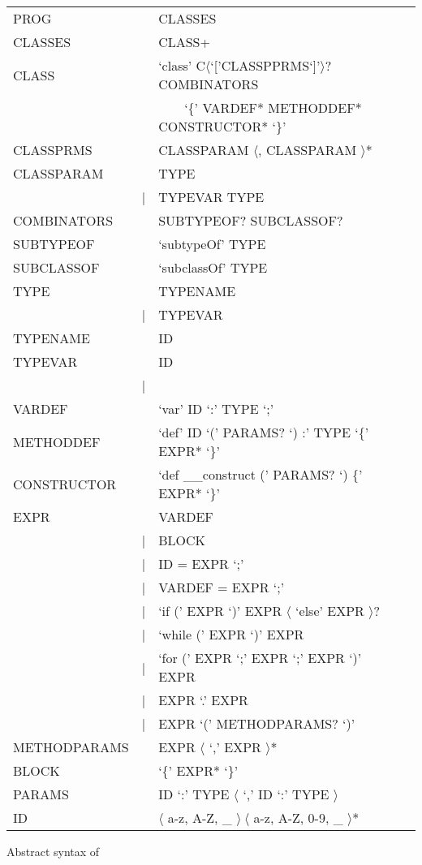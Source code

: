 \begin{listing}
	\begin{tabular}[H]{lrll}
		PROG & \lra & CLASSES \\
		CLASSES & \lra & CLASS+ \\
		CLASS & \lra & `class' C$\langle$`['CLASSPPRMS`]'$\rangle$? COMBINATORS \\
		& & ~~~~`\{' VARDEF* METHODDEF* CONSTRUCTOR* `\}' \\
		CLASSPRMS & \lra & CLASSPARAM $\langle$, CLASSPARAM $\rangle$* \\
		CLASSPARAM & \lra & TYPE \\
		 & | & TYPEVAR \match TYPE \\
		COMBINATORS & \lra & SUBTYPEOF? SUBCLASSOF? \\
		SUBTYPEOF & \lra & `subtypeOf' TYPE \\
		SUBCLASSOF & \lra & `subclassOf' TYPE \\
		TYPE & \lra & TYPENAME \\
		& | & TYPEVAR \\
		TYPENAME & \lra & ID \\
		TYPEVAR & \lra & ID \\
		& | & \mytype \\
		VARDEF & \lra & `var' ID `:' TYPE `;' \\
		METHODDEF & \lra & `def' ID `(' PARAMS? `) :' TYPE `\{' EXPR* `\}'  \\
		CONSTRUCTOR & \lra & `def \_\_construct (' PARAMS? `) \{' EXPR* `\}' \\
		EXPR & \lra & VARDEF \\
		& | & BLOCK \\
		& | & ID = EXPR `;' \\
		& | & VARDEF = EXPR `;' \\
		& | & `if (' EXPR `)' EXPR $\langle$ `else' EXPR $\rangle$?  \\
		& | & `while (' EXPR `)' EXPR \\
		& | & `for (' EXPR `;' EXPR `;' EXPR `)' EXPR \\
		& | & EXPR `.' EXPR \\
		& | & EXPR `(' METHODPARAMS? `)' \\
		METHODPARAMS & \lra & EXPR $\langle$ `,' EXPR $\rangle$* \\
		BLOCK & \lra & `\{' EXPR* `\}' \\
		PARAMS & \lra & ID `:' TYPE $\langle$ `,' ID `:' TYPE $\rangle$ \\
		ID & \lra & $\langle$ a-z, A-Z, \_ $\rangle~\langle$ a-z, A-Z, 0-9, \_ $\rangle$* \\
	\end{tabular}
	\caption{Abstract syntax of \ooplss}
	\label{lst:abstractSyntax}
\end{listing}

